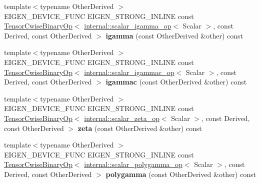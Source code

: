 \begin{DoxyCompactItemize}
{\footnotesize template$<$typename Other\+Derived $>$ }\\E\+I\+G\+E\+N\+\_\+\+D\+E\+V\+I\+C\+E\+\_\+\+F\+U\+NC E\+I\+G\+E\+N\+\_\+\+S\+T\+R\+O\+N\+G\+\_\+\+I\+N\+L\+I\+NE const \hyperlink{class_eigen_1_1_tensor_cwise_binary_op}{Tensor\+Cwise\+Binary\+Op}$<$ \hyperlink{struct_eigen_1_1internal_1_1scalar__igamma__op}{internal\+::scalar\+\_\+igamma\+\_\+op}$<$ Scalar $>$, const Derived, const Other\+Derived $>$ {\bfseries igamma} (const Other\+Derived \&other) const
\item 
\mbox{\label{class_eigen_1_1_tensor_base_3_01_derived_00_01_read_only_accessors_01_4_a612b30bbcc4e2dcff1b757945a8a32b4}} 
{\footnotesize template$<$typename Other\+Derived $>$ }\\E\+I\+G\+E\+N\+\_\+\+D\+E\+V\+I\+C\+E\+\_\+\+F\+U\+NC E\+I\+G\+E\+N\+\_\+\+S\+T\+R\+O\+N\+G\+\_\+\+I\+N\+L\+I\+NE const \hyperlink{class_eigen_1_1_tensor_cwise_binary_op}{Tensor\+Cwise\+Binary\+Op}$<$ \hyperlink{struct_eigen_1_1internal_1_1scalar__igammac__op}{internal\+::scalar\+\_\+igammac\+\_\+op}$<$ Scalar $>$, const Derived, const Other\+Derived $>$ {\bfseries igammac} (const Other\+Derived \&other) const
\item 
\mbox{\label{class_eigen_1_1_tensor_base_3_01_derived_00_01_read_only_accessors_01_4_a0d71c480ff32548f7411f9501933187f}} 
{\footnotesize template$<$typename Other\+Derived $>$ }\\E\+I\+G\+E\+N\+\_\+\+D\+E\+V\+I\+C\+E\+\_\+\+F\+U\+NC E\+I\+G\+E\+N\+\_\+\+S\+T\+R\+O\+N\+G\+\_\+\+I\+N\+L\+I\+NE const \hyperlink{class_eigen_1_1_tensor_cwise_binary_op}{Tensor\+Cwise\+Binary\+Op}$<$ \hyperlink{struct_eigen_1_1internal_1_1scalar__zeta__op}{internal\+::scalar\+\_\+zeta\+\_\+op}$<$ Scalar $>$, const Derived, const Other\+Derived $>$ {\bfseries zeta} (const Other\+Derived \&other) const
\item 
\mbox{\label{class_eigen_1_1_tensor_base_3_01_derived_00_01_read_only_accessors_01_4_a0475fa6a5f5820de9a14dfc79372dd6a}} 
{\footnotesize template$<$typename Other\+Derived $>$ }\\E\+I\+G\+E\+N\+\_\+\+D\+E\+V\+I\+C\+E\+\_\+\+F\+U\+NC E\+I\+G\+E\+N\+\_\+\+S\+T\+R\+O\+N\+G\+\_\+\+I\+N\+L\+I\+NE const \hyperlink{class_eigen_1_1_tensor_cwise_binary_op}{Tensor\+Cwise\+Binary\+Op}$<$ \hyperlink{struct_eigen_1_1internal_1_1scalar__polygamma__op}{internal\+::scalar\+\_\+polygamma\+\_\+op}$<$ Scalar $>$, const Derived, const Other\+Derived $>$ {\bfseries polygamma} (const Other\+Derived \&other) const

\end{DoxyCompactItemize}
